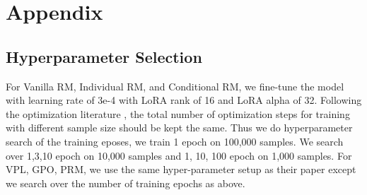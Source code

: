 \onecolumn
\section{Appendix}
\subsection{Hyperparameter Selection}
\label{hyperparam}
For Vanilla RM, Individual RM, and Conditional RM, we fine-tune the model with learning rate of 3e-4 with LoRA rank of 16 and LoRA alpha of 32. Following the optimization literature \cite{mccandlish2018empirical}, the total number of optimization steps for training with different sample size should be kept the same. Thus we do hyperparameter search of the training eposes, we train 1 epoch on 100,000 samples. We search over 1,3,10 epoch on 10,000 samples and 1, 10, 100 epoch on 1,000 samples. For VPL, GPO, PRM, we use the same hyper-parameter setup as their paper except we search over the number of training epochs as above.




